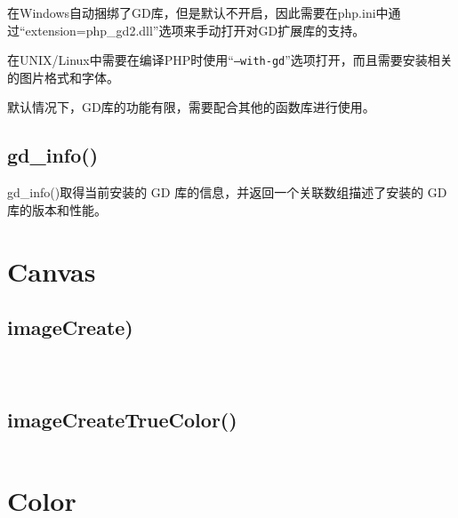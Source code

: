 在Windows自动捆绑了GD库，但是默认不开启，因此需要在php.ini中通过“extension=php\_gd2.dll”选项来手动打开对GD扩展库的支持。

在UNIX/Linux中需要在编译PHP时使用“\texttt{--with-gd}”选项打开，而且需要安装相关的图片格式和字体。


默认情况下，GD库的功能有限，需要配合其他的函数库进行使用。


\subsection{gd\_info()}


gd\_info()取得当前安装的 GD 库的信息，并返回一个关联数组描述了安装的 GD 库的版本和性能。



\section{Canvas}


\subsection{imageCreate)}


\begin{lstlisting}[language=PHP]

\end{lstlisting}




\begin{lstlisting}[language=PHP]

\end{lstlisting}





\begin{lstlisting}[language=PHP]

\end{lstlisting}


\subsection{imageCreateTrueColor()}








\begin{lstlisting}[language=PHP]

\end{lstlisting}


\section{Color}


